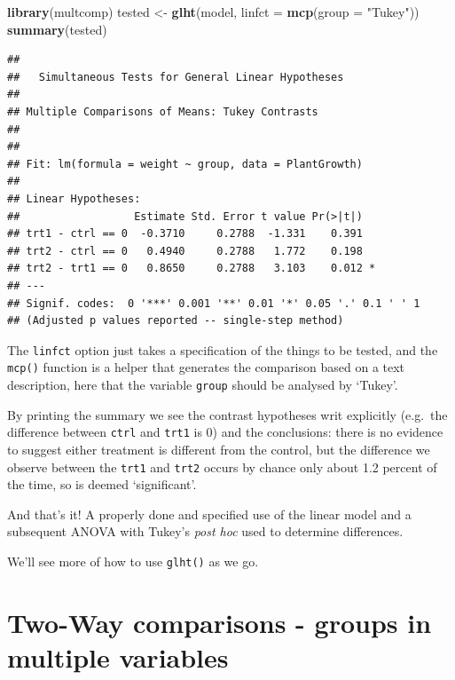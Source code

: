 \documentclass[
]{book}
\newenvironment{Shaded}{\begin{snugshade}}{\end{snugshade}}
\newcommand{\DataTypeTok}[1]{\textcolor[rgb]{0.13,0.29,0.53}{#1}}
\newcommand{\KeywordTok}[1]{\textcolor[rgb]{0.13,0.29,0.53}{\textbf{#1}}}
\newcommand{\NormalTok}[1]{#1}
\newcommand{\StringTok}[1]{\textcolor[rgb]{0.31,0.60,0.02}{#1}}
\begin{document}
\begin{Shaded}
\begin{Highlighting}[]
\KeywordTok{library}\NormalTok{(multcomp)}
\NormalTok{tested <-}\StringTok{ }\KeywordTok{glht}\NormalTok{(model, }\DataTypeTok{linfct =} \KeywordTok{mcp}\NormalTok{(}\DataTypeTok{group =} \StringTok{"Tukey"}\NormalTok{))}
\KeywordTok{summary}\NormalTok{(tested)}
\end{Highlighting}
\end{Shaded}

\begin{verbatim}
## 
## 	 Simultaneous Tests for General Linear Hypotheses
## 
## Multiple Comparisons of Means: Tukey Contrasts
## 
## 
## Fit: lm(formula = weight ~ group, data = PlantGrowth)
## 
## Linear Hypotheses:
##                  Estimate Std. Error t value Pr(>|t|)  
## trt1 - ctrl == 0  -0.3710     0.2788  -1.331    0.391  
## trt2 - ctrl == 0   0.4940     0.2788   1.772    0.198  
## trt2 - trt1 == 0   0.8650     0.2788   3.103    0.012 *
## ---
## Signif. codes:  0 '***' 0.001 '**' 0.01 '*' 0.05 '.' 0.1 ' ' 1
## (Adjusted p values reported -- single-step method)
\end{verbatim}

The \texttt{linfct} option just takes a specification of the things to be tested, and the \texttt{mcp()} function is a helper that generates the comparison based on a text description, here that the variable \texttt{group} should be analysed by `Tukey'.

By printing the summary we see the contrast hypotheses writ explicitly (e.g.~the difference between \texttt{ctrl} and \texttt{trt1} is 0) and the conclusions: there is no evidence to suggest either treatment is different from the control, but the difference we observe between the \texttt{trt1} and \texttt{trt2} occurs by chance only about 1.2 percent of the time, so is deemed `significant'.

And that's it! A properly done and specified use of the linear model and a subsequent ANOVA with Tukey's \emph{post hoc} used to determine differences.

We'll see more of how to use \texttt{glht()} as we go.

\hypertarget{two-way-comparisons---groups-in-multiple-variables}{%
\section{Two-Way comparisons - groups in multiple variables}\label{two-way-comparisons---groups-in-multiple-variables}}
\end{document}

